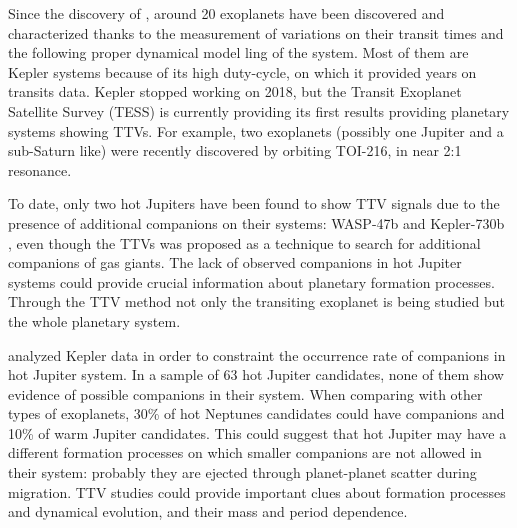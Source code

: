 Since the discovery of \cite{Holman2010}, around 20 exoplanets have been discovered and characterized thanks to the measurement of variations on their transit times and the following proper dynamical model ling of the system. Most of them are Kepler systems because of its high duty-cycle, on which it provided years on transits data. Kepler stopped working on 2018, but the Transit Exoplanet Satellite Survey (TESS) is currently providing its first results providing planetary systems showing TTVs.  For example, two exoplanets (possibly one Jupiter and a sub-Saturn like) were recently discovered by \cite{Dawson2019} orbiting TOI-216, in near 2:1 resonance. 

To date, only two hot Jupiters have been found to show TTV signals due to the presence of additional companions on their systems: WASP-47b \citep{Becker2015} and Kepler-730b \citep{Canas2019}, even though the TTVs was proposed as a technique to search for additional companions of gas giants. The lack of observed companions in hot Jupiter systems could provide crucial information about planetary formation processes. Through the TTV method not only the transiting exoplanet is being studied but the whole planetary system. 

\cite{Steffen2012b} analyzed Kepler data in order to constraint the occurrence rate of companions in hot Jupiter system. In a sample of 63 hot Jupiter candidates, none of them show evidence of possible companions in their system. When comparing with other types of exoplanets, 30\% of hot Neptunes candidates could have companions and 10\% of warm Jupiter candidates. This could suggest that hot Jupiter may have a different formation processes on which smaller companions are not allowed in their system: probably they are ejected through planet-planet scatter during migration. TTV studies could provide important clues about formation processes and dynamical evolution, and their mass and period dependence. 


